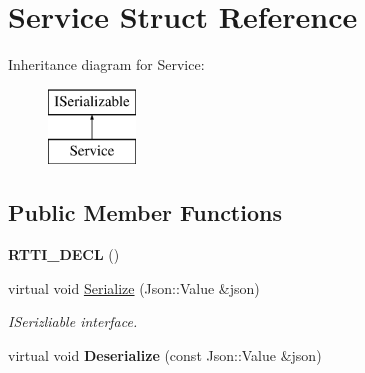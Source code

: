 \hypertarget{struct_service}{}\section{Service Struct Reference}
\label{struct_service}
Inheritance diagram for Service\+:\begin{figure}[H]
\begin{center}
\leavevmode
\includegraphics[height=2.000000cm]{struct_service}
\end{center}
\end{figure}
\subsection*{Public Member Functions}
\begin{DoxyCompactItemize}
\item 
\mbox{\label{struct_service_a6c99ccc7d72a2a08484194744bd72e14}} 
{\bfseries R\+T\+T\+I\+\_\+\+D\+E\+CL} ()
\item 
\mbox{\label{struct_service_a744bdb99f5faffe4383f7e00d7093f26}} 
virtual void \hyperlink{struct_service_a744bdb99f5faffe4383f7e00d7093f26}{Serialize} (Json\+::\+Value \&json)
\begin{DoxyCompactList}\small\item\em I\+Serizliable interface. \end{DoxyCompactList}\item 
\mbox{\label{struct_service_a8ffb41356aa4aacdab3b237b86982902}} 
virtual void {\bfseries Deserialize} (const Json\+::\+Value \&json)
\end{DoxyCompactItemize}
